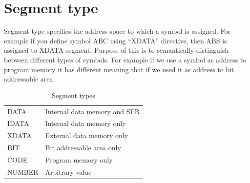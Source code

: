 \documentclass[a4paper,twoside,12pt]{book}
\newcommand{\mysmallfont}{\fontsize{8pt}{10pt} \selectfont{}}
\begin{document}
	\clearpage
	\section{Segment type}
		Segment type specifies the address space to which a symbol is assigned. For example if you define symbol ABC using ``XDATA'' directive, then ABS is assigned to XDATA segment. Purpose of this is to semantically distinguish between different types of symbols. For example if we use a symbol as address to program memory it has different meaning that if we used it as address to bit addressable area.
		\begin{table}[h!]
			\centering{}
			\mysmallfont{}
			\begin{tabular}{|ll|}
				\hline
				DATA	& Internal data memory and SFR \\
				IDATA	& Internal data memory only \\
				XDATA	& External data memory only \\
				BIT	& Bit addressable area only \\
				CODE	& Program memory only \\
				NUMBER	& Arbitrary value \\
				\hline
			\end{tabular}
			\caption{Segment types}
		\end{table}
\end{document}
